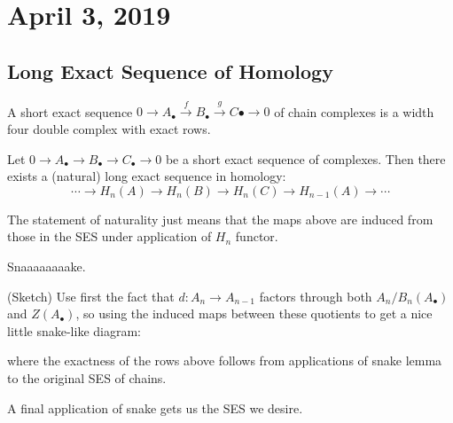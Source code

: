 \documentclass[12pt]{article}
\begin{document}
\section{April 3, 2019}
\subsection{Long Exact Sequence of Homology}
\begin{defn}
	A short exact sequence $0\to A_\bullet\xrightarrow{f} B_\bullet\xrightarrow{g} C\bullet\to 0$
	of chain complexes is a width four double complex with exact rows.
\end{defn}
\begin{thm}
	Let $0\to A_\bullet\to B_\bullet\to C_\bullet\to 0$ be a short exact sequence of complexes. Then 
	there exists a (natural) long exact sequence in homology:
	\[\cdots\to H_n(A)\to H_n(B)\to H_n(C)\to H_{n-1}(A)\to\cdots\]
\end{thm}
\begin{rmk}
	The statement of naturality just means that the maps above are induced from those in the SES
	under application of $H_n$ functor.
\end{rmk}
\begin{prf}
	Snaaaaaaaake.

	(Sketch) Use first the fact that $d:A_n\to A_{n-1}$ factors through both $A_n/B_n(A_\bullet)$ and $Z(A_\bullet)$,
	so using the induced maps between these quotients to get a nice little snake-like diagram:

	\begin{center}
	\end{center}	

	where the exactness of the rows above follows from applications of snake lemma to the original
	SES of chains.

	A final application of snake gets us the SES we desire.
\end{prf}
\end{document}
